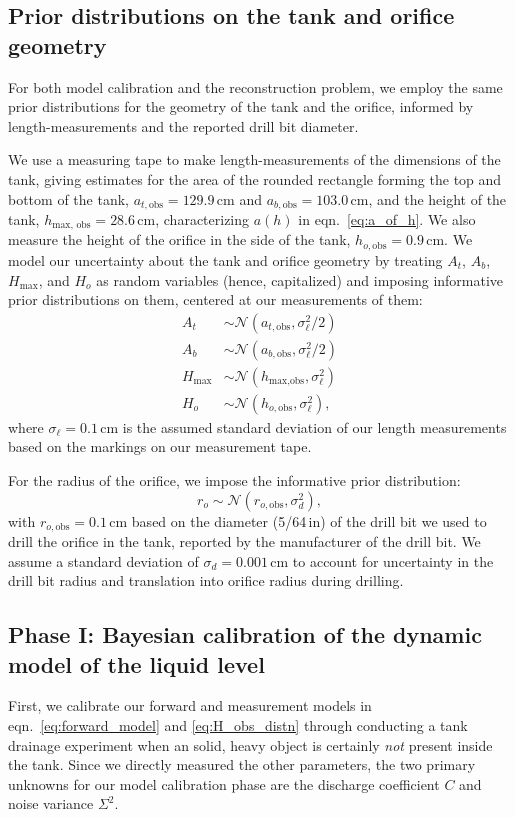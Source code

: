 \documentclass[openacc]{rsproca_new}%
\begin{document}
\subsection{Prior distributions on the tank and orifice geometry}
For both model calibration and the reconstruction problem, we employ the same prior distributions for the geometry of the tank and the orifice, informed by length-measurements and the reported drill bit diameter.

We use a measuring tape to make length-measurements of the dimensions of the tank, giving estimates for the area of the rounded rectangle forming the top and bottom of the tank, $a_{t, \text{obs}}=129.9$\,cm and $a_{b, \text{obs}}=103.0$\,cm, and the height of the tank, $h_{\text{max, obs}}=28.6$\,cm, characterizing $a(h)$ in eqn.~\ref{eq:a_of_h}. We also measure the height of the orifice in the side of the tank, $h_{o, \text{obs}}=0.9$\,cm. We model our uncertainty about the tank and orifice geometry by treating $A_t$, $A_b$, $H_{\text{max}}$, and $H_o$ as random variables (hence, capitalized) and imposing informative prior distributions on them, centered at our measurements of them:
\begin{align}
A_t &\sim \mathcal{N}(a_{t, \text{obs}}, \sigma_\ell^2/2) \label{eq:A_t_prior} \\
A_b &\sim \mathcal{N}(a_{b, \text{obs}}, \sigma_\ell^2/2) \\
H_{\text{max}} &\sim \mathcal{N}(h_{\text{max}, \text{obs}}, \sigma_\ell^2) \\
H_o &\sim \mathcal{N}(h_{o, \text{obs}}, \sigma_\ell^2),
\end{align}
where $\sigma_\ell=0.1$\,cm is the assumed standard deviation of our length measurements based on the markings on our measurement tape.

For the radius of the orifice, we impose the informative prior distribution:
\begin{equation}
r_o \sim \mathcal{N}(r_{o, \text{obs}}, \sigma_d^2), \label{eq:R_o_prior}
\end{equation}
with $r_{o, \text{obs}}=0.1$\,cm based on the diameter (5/64\,in) of the drill bit we used to drill the orifice in the tank, reported by the manufacturer of the drill bit. We assume a standard deviation of $\sigma_d= 0.001$\,cm to account for uncertainty in the drill bit radius and translation into orifice radius during drilling.

\subsection{Phase I: Bayesian calibration of the dynamic model of the liquid level}
First, we calibrate our forward and measurement models in eqn.~\ref{eq:forward_model} and \ref{eq:H_obs_distn} through conducting a tank drainage experiment when an solid, heavy object is certainly \emph{not} present inside the tank. 
Since we directly measured the other parameters, the two primary unknowns for our model calibration phase are the discharge coefficient $C$ and noise variance $\Sigma^2$. 
\end{document}
